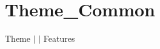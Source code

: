 \chapter{Theme\+\_\+\+Common }
\hypertarget{md__docs_2_common_2_features_2_theme___common}{}\label{md__docs_2_common_2_features_2_theme___common}
Theme \texorpdfstring{$\vert$}{|}  \texorpdfstring{$\vert$}{|} Features



 